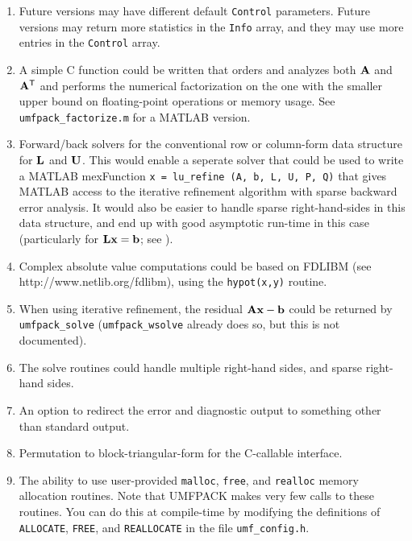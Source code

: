 \begin{enumerate}

\item Future versions may have different default {\tt Control} parameters.
    Future versions may return more statistics in the {\tt Info} array, and
    they may use more entries in the {\tt Control} array.

\item A simple C function could be written that orders and analyzes both
        ${\bf{A}}$ and ${\bf{A}}^{\sf T}$ and performs the numerical factorization
        on the one with the smaller upper bound on floating-point operations
        or memory usage.  See {\tt umfpack\_factorize.m} for a MATLAB version.

\item Forward/back solvers for the conventional row or column-form data
        structure for ${\bf{L}}$ and ${\bf{U}}$.  This would enable a seperate
        solver that could be used to write a MATLAB mexFunction
        {\tt x = lu\_refine (A, b, L, U, P, Q)} that gives MATLAB access
        to the iterative refinement algorithm with sparse backward error
        analysis.  It would also be easier to handle sparse right-hand-sides
        in this data structure, and end up with good asymptotic run-time
        in this case
        (particularly for ${\bf{Lx}}={\bf{b}}$; see \cite{GilbertPeierls88}).

\item Complex absolute value computations could be
        based on FDLIBM (see http://www.netlib.org/fdlibm),
        using the {\tt hypot(x,y)} routine.

\item When using iterative refinement, the residual ${\bf{Ax}}-{\bf{b}}$ could be
    returned by {\tt umfpack\_solve} ({\tt umfpack\_wsolve} already does so,
    but this is not documented).

\item The solve routines could handle multiple right-hand sides, and sparse
    right-hand sides.

\item An option to redirect the error and diagnostic output to something
    other than standard output.

\item Permutation to block-triangular-form \cite{Duff78a} for the C-callable
    interface.

\item The ability to use user-provided {\tt malloc}, {\tt free}, and
    {\tt realloc} memory allocation routines.  Note that UMFPACK makes very
    few calls to these routines.  You can do this at compile-time by
    modifying the definitions of {\tt ALLOCATE}, {\tt FREE}, and
    {\tt REALLOCATE} in the file {\tt umf\_config.h}.


\end{enumerate}
